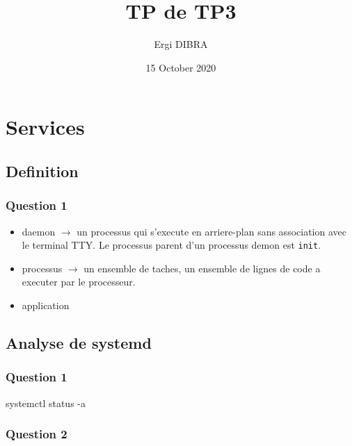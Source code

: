 \documentclass[]{article}
\title{TP de TP3}
\author{Ergi DIBRA}
\date{15 October 2020}
\newenvironment{Shaded}{}{}
\newcommand{\ExtensionTok}[1]{#1}
\newcommand{\NormalTok}[1]{#1}
\providecommand{\tightlist}{%
  \setlength{\itemsep}{0pt}\setlength{\parskip}{0pt}}
\begin{document}
\maketitle

{
\hypersetup{linkcolor=}
\setcounter{tocdepth}{2}
\tableofcontents
}
\hypertarget{services}{%
\section{Services}\label{services}}

\hypertarget{definition}{%
\subsection{Definition}\label{definition}}

\hypertarget{question-1}{%
\subsubsection{Question 1}\label{question-1}}

\begin{itemize}
\tightlist
\item
  daemon \(\rightarrow\) un processus qui s'execute en arriere-plan sans
  association avec le terminal TTY. Le processus parent d'un processus
  demon est \texttt{init}.
\item
  processus \(\rightarrow\) un ensemble de taches, un ensemble de lignes
  de code a executer par le processeur.
\item
  application
\end{itemize}

\hypertarget{analyse-de-systemd}{%
\subsection{Analyse de systemd}\label{analyse-de-systemd}}

\hypertarget{question-1-1}{%
\subsubsection{Question 1}\label{question-1-1}}

\begin{Shaded}
\begin{Highlighting}[]
\ExtensionTok{systemctl}\NormalTok{ status -a}
\end{Highlighting}
\end{Shaded}

\hypertarget{question-2}{%
\subsubsection{Question 2}\label{question-2}}
\end{document}
